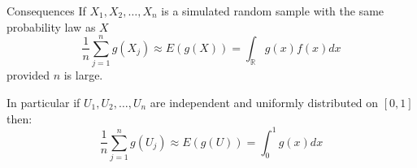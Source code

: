 \documentclass[8pt]{beamer}
\begin{document}
\begin{frame}{Consequences}
If $X_1,X_2,\ldots,X_n$ is a simulated random sample with the same probability law as $X$  \\
\begin{equation*}
    \frac{1}{n} \sum_{j=1}^n g(X_j) \approx E(g(X))=\int_{\mathbb{R}} g(x)f(x) dx
\end{equation*}
provided $n$ is large.

\vspace{3mm}

In particular if $U_1,U_2,\ldots,U_n$ are independent and uniformly distributed on $[0,1]$ then:
\begin{equation*}
    \frac{1}{n} \sum_{j=1}^n g(U_j) \approx E(g(U))=\int_{0}^1 g(x) dx
\end{equation*}
\end{frame}
\end{document}
